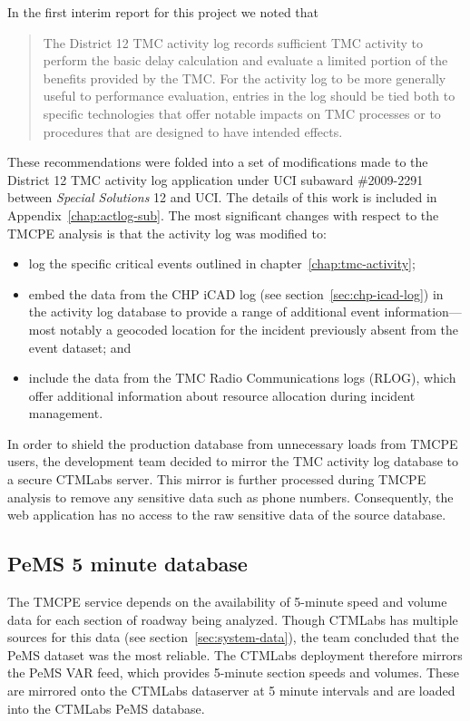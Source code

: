 \documentclass[12pt]{report}
\begin{document}
In the first interim report for this project
\citep{rindt08:_measur_based_system_for_tmc_perfor_evaluat} we noted
that
\begin{quote}
  The District 12 \ac{TMC} activity log records sufficient \ac{TMC} activity to
  perform the basic delay calculation and evaluate a limited portion of the
  benefits provided by the \ac{TMC}. For the activity log to be more generally
  useful to performance evaluation, entries in the log should be tied both to
  specific technologies that offer notable impacts on \ac{TMC} processes or to
  procedures that are designed to have intended effects.
\end{quote}
These recommendations were folded into a set of modifications made to the
District 12 \ac{TMC} activity log application under UCI subaward \#2009-2291
between \emph{Special Solutions} 12 and UCI.  The details of this work is included in
Appendix~\ref{chap:actlog-sub}.  The most significant changes with respect to
the \ac{TMCPE} analysis is that the activity log was modified to:
\begin{itemize}
\item log the specific critical events outlined in
  chapter~\ref{chap:tmc-activity};
\item embed the data from the \ac{CHP} \ac{iCAD} log (see
  section~\ref{sec:chp-icad-log}) in the activity log database to
  provide a range of additional event information---most notably a
  geocoded location for the incident previously absent from the event
  dataset; and
\item include the data from the \ac{TMC} Radio Communications logs (RLOG),
  which offer additional information about resource allocation during
  incident management.
\end{itemize}

In order to shield the production database from unnecessary loads from
\ac{TMCPE} users, the development team decided to mirror the \ac{TMC} activity
log database to a secure \ac{CTMLabs} server.  This mirror is further processed
during \ac{TMCPE} analysis to remove any sensitive data such as phone numbers.
Consequently, the web application has no access to the raw sensitive data of the
source database.


\subsection{PeMS 5 minute database}
\label{sec:pems-5-min}

The \ac{TMCPE} service depends on the availability of 5-minute speed and volume
data for each section of roadway being analyzed.  Though \ac{CTMLabs} has
multiple sources for this data (see section~\ref{sec:system-data}), the team
concluded that the \ac{PeMS} dataset was the most reliable.  The \ac{CTMLabs}
deployment therefore mirrors the \ac{PeMS} \ac{VAR} feed, which provides
5-minute section speeds and volumes.  These are mirrored onto the \ac{CTMLabs}
dataserver at 5 minute intervals and are loaded into the \ac{CTMLabs} \ac{PeMS}
database.
\end{document}
